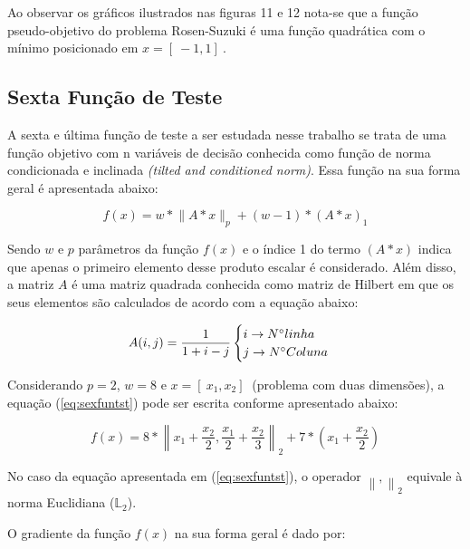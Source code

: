 Ao observar os gráficos ilustrados nas figuras 11 e 12 nota-se que a função pseudo-objetivo do problema Rosen-Suzuki é uma função quadrática com o mínimo posicionado em $x=[\ -1 , 1 ]\ $.

\subsection{Sexta Função de Teste}\label{sec:sexfun}

A sexta e última função de teste a ser estudada nesse trabalho se trata de uma função objetivo com n variáveis de decisão conhecida como função de  norma condicionada e inclinada \textit{(tilted and conditioned norm)}. Essa função na sua forma geral é apresentada abaixo:

\begin{equation}\label{eq:sexfuntst}
  f(x)= w*\lVert A*x \rVert_p+(w-1)*(A*x)_1
\end{equation}

Sendo $w$ e $p$ parâmetros da função $f(x)$ e o índice 1 do termo $(A*x)$ indica que apenas o primeiro elemento desse produto escalar é considerado. Além disso, a matriz $A$ é uma matriz quadrada conhecida como matriz de Hilbert em que os seus elementos são calculados de acordo com a equação abaixo:

\begin{equation}\label{eq:auxsexfuntst}
  A(i,j)= \frac{1}{1+i-j} \begin{cases}
        i \rightarrow N\degree linha\\
        j \rightarrow N\degree Coluna
    \end{cases}
\end{equation}

Considerando $p=2$, $w=8$ e $x=[\ x_1 , x_2 ]\ $ (problema com duas dimensões), a equação (\ref{eq:sexfuntst}) pode ser escrita conforme apresentado abaixo:

\newcommand\norm[1]{\left\lVert#1\right\rVert}

\begin{equation}\label{eq:sexfuntst}
  f(x)= 8*\norm{ x_1 + \frac{x_2}{2},\frac{x_1}{2}+\frac{x_2}{3} }_2+7*(x_1+\frac{x_2}{2}) 
\end{equation}

No caso da equação apresentada em (\ref{eq:sexfuntst}), o operador $\norm{,}_2$  equivale à norma Euclidiana ($\mathbb{L}_2$). \par
O gradiente da função $f(x)$ na sua forma geral é dado por:

